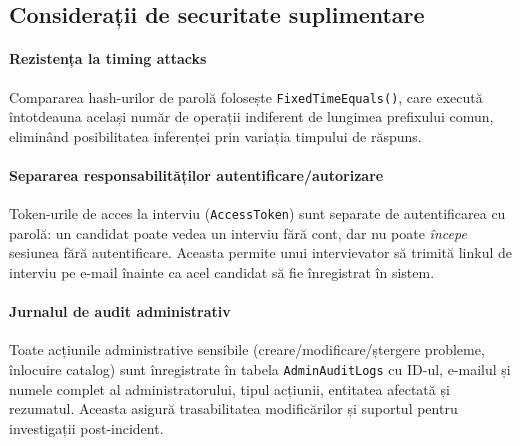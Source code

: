 \subsection{Considerații de securitate suplimentare}

\paragraph{Rezistența la timing attacks}
Compararea hash-urilor de parolă folosește \texttt{FixedTimeEquals()},
care execută întotdeauna același număr de operații indiferent de lungimea
prefixului comun, eliminând posibilitatea inferenței prin variația
timpului de răspuns.

\paragraph{Separarea responsabilităților autentificare/autorizare}
Token-urile de acces la interviu (\texttt{AccessToken}) sunt separate
de autentificarea cu parolă: un candidat poate vedea un interviu fără
cont, dar nu poate \emph{începe} sesiunea fără autentificare. Aceasta
permite unui intervievator să trimită linkul de interviu pe e-mail înainte
ca acel candidat să fie înregistrat în sistem.

\paragraph{Jurnalul de audit administrativ}
Toate acțiunile administrative sensibile (creare/modificare/ștergere
probleme, înlocuire catalog) sunt înregistrate în tabela
\texttt{AdminAuditLogs} cu ID-ul, e-mailul și numele complet al
administratorului, tipul acțiunii, entitatea afectată și rezumatul.
Aceasta asigură trasabilitatea modificărilor și suportul pentru
investigații post-incident.

